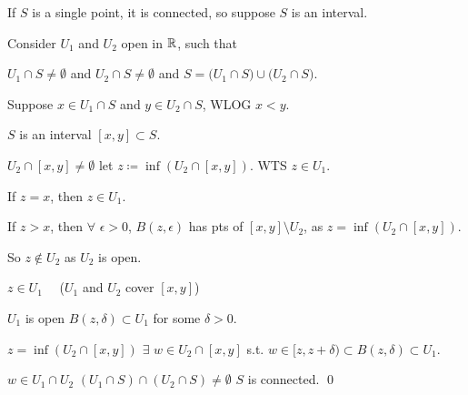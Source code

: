 \documentclass[10pt,aspectratio=169]{beamer}
\begin{document}
\begin{frame}

If $S$ is a single point, it is connected,
\pause
\quad
so suppose $S$ is an interval.

\pause
\medskip

Consider $U_1$ and $U_2$ open in ${\mathbb{R}}$, such that

\pause
$U_1 \cap S \not= \emptyset$ and $U_2 \cap S \not= \emptyset$ and $S =
\bigl( U_1 \cap S \bigr) \cup \bigl( U_2 \cap S \bigr)$.

\pause
Suppose $x \in U_1 \cap S$ and $y \in U_2 \cap S$, WLOG $x < y$.

\pause
$S$ is an interval \wthus $[x,y] \subset S$.

\pause
$U_2 \cap [x,y] \not= \emptyset$
\pause
\quad
let $z \coloneqq \inf (U_2 \cap [x,y])$.
\pause
\quad
WTS $z \in U_1$.

\pause
If $z = x$, then $z \in U_1$.

\pause
If $z > x$, then $\forall$ $\epsilon > 0$,
$B(z,\epsilon)$ has pts of $[x,y] \setminus U_2$,
as $z = \inf (U_2 \cap [x,y])$.

\pause
So $z \notin U_2$ as $U_2$ is open.

\pause
\thus \quad $z \in U_1$  ~~($U_1$ and $U_2$ cover $[x,y]$)

\pause
$U_1$ is open \wthus $B(z,\delta) \subset U_1$ for some $\delta > 0$.

\pause
$z = \inf (U_2 \cap [x,y])$
\pause
\wthus $\exists$
$w \in U_2 \cap [x,y]$ s.t. $w \in [z,z+\delta) \subset B(z,\delta) \subset U_1$.

\pause
\begin{center}
\end{center}

\pause
\thus\quad
$w \in U_1 \cap U_2$
\pause
\wthus
$(U_1 \cap S) \cap (U_2 \cap S) \not= \emptyset$
\pause
\wthus
$S$ is connected.
\qed

\end{frame}
\end{document}
